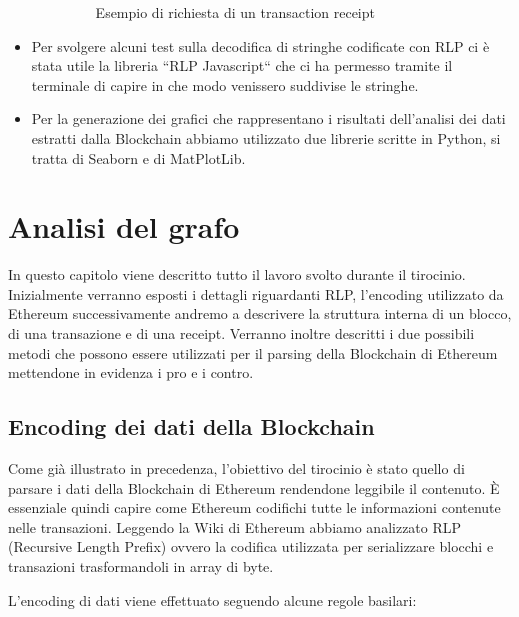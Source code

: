 \documentclass[12pt]{report}
\begin{document}
\begin{itemize}
\begin{itemize}
\begin{figure}[H]
                \caption{Esempio di richiesta di un transaction receipt}
            \end{figure}
        \end{itemize}
    \item Per svolgere alcuni test sulla decodifica di stringhe codificate con RLP ci è stata utile la libreria ``RLP Javascript`` \cite{RLPGitHub} che ci ha permesso tramite il terminale di capire in che modo venissero suddivise le stringhe.
    \item Per la generazione dei grafici che rappresentano i risultati dell'analisi dei dati estratti dalla Blockchain abbiamo utilizzato due librerie scritte in Python, si tratta di Seaborn\cite{Seaborn} e di MatPlotLib\cite{MatPlotLib}.
\end{itemize}


\chapter{Analisi del grafo}

In questo capitolo viene descritto tutto il lavoro svolto durante il tirocinio. Inizialmente verranno esposti i dettagli riguardanti RLP, l'encoding utilizzato da Ethereum successivamente andremo a descrivere la struttura interna di un blocco, di una transazione e di una receipt.
Verranno inoltre descritti i due possibili metodi che possono essere utilizzati per il parsing della Blockchain di Ethereum mettendone in evidenza i pro e i contro.

\section{Encoding dei dati della Blockchain}

Come già illustrato in precedenza, l'obiettivo del tirocinio è stato quello di parsare i dati della Blockchain di Ethereum rendendone leggibile il contenuto.
È essenziale quindi capire come Ethereum codifichi tutte le informazioni contenute nelle transazioni.
Leggendo la Wiki di Ethereum \cite{RLP} abbiamo  analizzato RLP (Recursive Length Prefix) ovvero la codifica utilizzata per serializzare blocchi e transazioni trasformandoli in array di byte.

L'encoding di dati viene effettuato seguendo alcune regole basilari:
\end{document}
